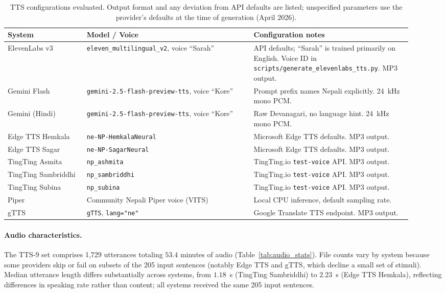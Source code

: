 \documentclass[11pt]{article}
\begin{document}
\begin{table}[h]
\centering
\caption{TTS configurations evaluated. Output format and any deviation from API defaults are listed; unspecified parameters use the provider's defaults at the time of generation (April 2026).}
\label{tab:tts_configs}
\footnotesize
\setlength{\tabcolsep}{4pt}
\begin{tabular}{p{0.18\linewidth}p{0.38\linewidth}p{0.36\linewidth}}
\toprule
System & Model / Voice & Configuration notes \\
\midrule
ElevenLabs v3 & \texttt{eleven\_multilingual\_v2}, voice ``Sarah'' & API defaults; ``Sarah'' is trained primarily on English. Voice ID in \texttt{scripts/generate\_elevenlabs\_tts.py}. MP3 output. \\
Gemini Flash & \texttt{gemini-2.5-flash-preview-tts}, voice ``Kore'' & Prompt prefix names Nepali explicitly. 24~kHz mono PCM. \\
Gemini (Hindi) & \texttt{gemini-2.5-flash-preview-tts}, voice ``Kore'' & Raw Devanagari, no language hint. 24~kHz mono PCM. \\
Edge TTS Hemkala & \texttt{ne-NP-HemkalaNeural} & Microsoft Edge TTS defaults. MP3 output. \\
Edge TTS Sagar & \texttt{ne-NP-SagarNeural} & Microsoft Edge TTS defaults. MP3 output. \\
TingTing Asmita & \texttt{np\_ashmita} & TingTing.io \texttt{test-voice} API. MP3 output. \\
TingTing Sambriddhi & \texttt{np\_sambriddhi} & TingTing.io \texttt{test-voice} API. MP3 output. \\
TingTing Subina & \texttt{np\_subina} & TingTing.io \texttt{test-voice} API. MP3 output. \\
Piper & Community Nepali Piper voice (VITS) & Local CPU inference, default sampling rate. \\
gTTS & \texttt{gTTS}, \texttt{lang="ne"} & Google Translate TTS endpoint. MP3 output. \\
\bottomrule
\end{tabular}
\end{table}

\paragraph{Audio characteristics.} The TTS-9 set comprises 1{,}729 utterances totaling $53.4$ minutes of audio (Table~\ref{tab:audio_stats}). File counts vary by system because some providers skip or fail on subsets of the 205 input sentences (notably Edge TTS and gTTS, which decline a small set of stimuli). Median utterance length differs substantially across systems, from $1.18$~s (TingTing Sambriddhi) to $2.23$~s (Edge TTS Hemkala), reflecting differences in speaking rate rather than content; all systems received the same 205 input sentences.
\end{document}
